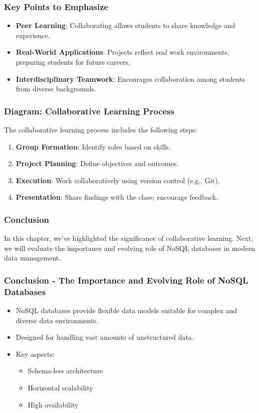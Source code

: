 \documentclass[aspectratio=169]{beamer}
\begin{document}
\begin{frame}[fragile]
    \frametitle{Key Points to Emphasize}
    \begin{itemize}
        \item \textbf{Peer Learning}: Collaborating allows students to share knowledge and experience.
        \item \textbf{Real-World Applications}: Projects reflect real work environments, preparing students for future careers.
        \item \textbf{Interdisciplinary Teamwork}: Encourages collaboration among students from diverse backgrounds.
    \end{itemize}
\end{frame}

\begin{frame}[fragile]
    \frametitle{Diagram: Collaborative Learning Process}
    The collaborative learning process includes the following steps:
    \begin{enumerate}
        \item \textbf{Group Formation}: Identify roles based on skills.
        \item \textbf{Project Planning}: Define objectives and outcomes.
        \item \textbf{Execution}: Work collaboratively using version control (e.g., Git).
        \item \textbf{Presentation}: Share findings with the class; encourage feedback.
    \end{enumerate}
\end{frame}

\begin{frame}[fragile]
    \frametitle{Conclusion}
    In this chapter, we've highlighted the significance of collaborative learning. 
    Next, we will evaluate the importance and evolving role of NoSQL databases in modern data management.
\end{frame}

\begin{frame}[fragile]
    \frametitle{Conclusion - The Importance and Evolving Role of NoSQL Databases}
    \begin{itemize}
        \item NoSQL databases provide flexible data models suitable for complex and diverse data environments.
        \item Designed for handling vast amounts of unstructured data.
        \item Key aspects:
        \begin{itemize}
            \item Schema-less architecture
            \item Horizontal scalability
            \item High availability
        \end{itemize}
    \end{itemize}
\end{frame}
\end{document}
